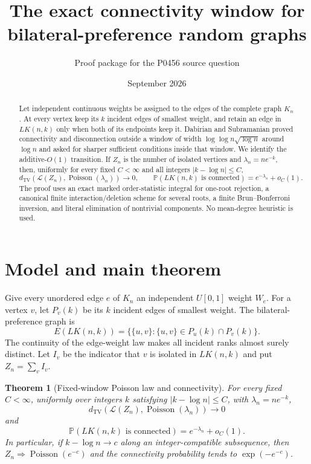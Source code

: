 \documentclass[11pt]{article}
\title{The exact connectivity window for bilateral-preference random graphs}
\author{Proof package for the P0456 source question}
\date{September 2026}
\newtheorem{theorem}{Theorem}[section]
\newcommand{\Pp}{\mathbb P}
\newcommand{\1}{\mathbf 1}
\newcommand{\TV}{\mathrm{TV}}
\newcommand{\Poi}{\operatorname{Poisson}}
\newcommand{\LK}{LK}
\begin{document}
\maketitle

\begin{abstract}
Let independent continuous weights be assigned to the edges of the complete graph $K_n$.
At every vertex keep its $k$ incident edges of smallest weight, and retain an edge in
$\LK(n,k)$ only when both of its endpoints keep it.  Dabirian and Subramanian proved
connectivity and disconnection outside a window of width
$\log\log n\sqrt{\log n}$ around $\log n$ and asked for sharper sufficient conditions
inside that window.  We identify the additive-$O(1)$ transition.  If $Z_n$ is the number
of isolated vertices and $\lambda_n=ne^{-k}$, then, uniformly for every fixed $C<\infty$
and all integers $|k-\log n|\le C$,
\[
 d_{\TV}(\mathcal L(Z_n),\Poi(\lambda_n))\longrightarrow0,
 \qquad
 \Pp(\LK(n,k)\text{ is connected})=e^{-\lambda_n}+o_C(1).
\]
The proof uses an exact marked order-statistic integral for one-root rejection, a canonical
finite interaction/deletion scheme for several roots, a finite Brun--Bonferroni inversion,
and literal elimination of nontrivial components.  No mean-degree heuristic is used.
\end{abstract}

\section{Model and main theorem}

Give every unordered edge $e$ of $K_n$ an independent $U[0,1]$ weight $W_e$.
For a vertex $v$, let $P_v(k)$ be its $k$ incident edges of smallest weight.
The bilateral-preference graph is
\[
 E(\LK(n,k))=\{\{u,v\}:\{u,v\}\in P_u(k)\cap P_v(k)\}.
\]
The continuity of the edge-weight law makes all incident ranks almost surely distinct.
Let $I_v$ be the indicator that $v$ is isolated in $\LK(n,k)$ and put
$Z_n=\sum_v I_v$.

\begin{theorem}[Fixed-window Poisson law and connectivity]\label{thm:main}
For every fixed $C<\infty$, uniformly over integers $k$ satisfying
$|k-\log n|\le C$, with $\lambda_n=ne^{-k}$,
\[
 d_{\TV}(\mathcal L(Z_n),\Poi(\lambda_n))\to0
\]
and
\[
 \Pp(\LK(n,k)\text{ is connected})=e^{-\lambda_n}+o_C(1).
\]
In particular, if $k-\log n\to c$ along an integer-compatible subsequence, then
$Z_n\Rightarrow\Poi(e^{-c})$ and the connectivity probability tends to
$\exp(-e^{-c})$.
\end{theorem}
\end{document}
